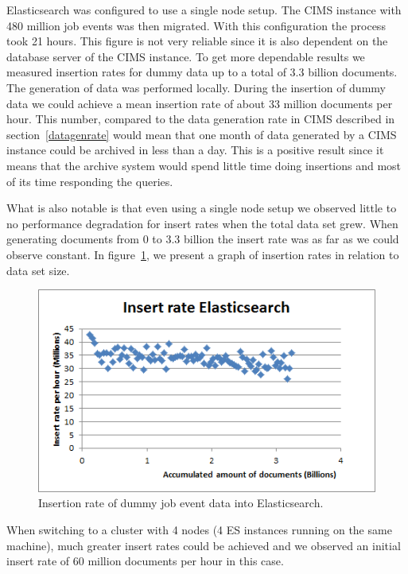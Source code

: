 Elasticsearch was configured to use a single node setup. The CIMS instance with 480 million job events was then migrated. With this configuration the process took 21 hours. This figure is not very reliable since it is also dependent on the database server of the CIMS instance. To get more dependable results we measured insertion rates for dummy data up to a total of 3.3 billion documents. The generation of data was performed locally. During the insertion of dummy data we could achieve a mean insertion rate of about 33 million documents per hour. This number, compared to the data generation rate in CIMS described in section~\ref{datagenrate} would mean that one month of data generated by a CIMS instance could be archived in less than a day. This is a positive result since it means that the archive system would spend little time doing insertions and most of its time responding the queries.

What is also notable is that even using a single node setup we observed little to no performance degradation for insert rates when the total data set grew. When generating documents from 0 to 3.3 billion the insert rate was as far as we could observe constant. In figure~\ref{fig:insert_rate}, we present a graph of insertion rates in relation to data set size.

\begin{figure}[h!]
\centering
\includegraphics[]{figure/insert_rate.png}
\caption{Insertion rate of dummy job event data into Elasticsearch.}
\label{fig:insert_rate}
\end{figure}

When switching to a cluster with 4 nodes (4 ES instances running on the same machine), much greater insert rates could be achieved and we observed an initial insert rate of 60 million documents per hour in this case.

